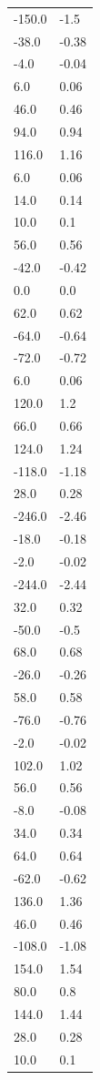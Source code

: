 \begin{longtable}{ll}
-150.0 & -1.5 \\
-38.0 & -0.38 \\
-4.0 & -0.04 \\
6.0 & 0.06 \\
46.0 & 0.46 \\
94.0 & 0.94 \\
116.0 & 1.16 \\
6.0 & 0.06 \\
14.0 & 0.14 \\
10.0 & 0.1 \\
56.0 & 0.56 \\
-42.0 & -0.42 \\
0.0 & 0.0 \\
62.0 & 0.62 \\
-64.0 & -0.64 \\
-72.0 & -0.72 \\
6.0 & 0.06 \\
120.0 & 1.2 \\
66.0 & 0.66 \\
124.0 & 1.24 \\
-118.0 & -1.18 \\
28.0 & 0.28 \\
-246.0 & -2.46 \\
-18.0 & -0.18 \\
-2.0 & -0.02 \\
-244.0 & -2.44 \\
32.0 & 0.32 \\
-50.0 & -0.5 \\
68.0 & 0.68 \\
-26.0 & -0.26 \\
58.0 & 0.58 \\
-76.0 & -0.76 \\
-2.0 & -0.02 \\
102.0 & 1.02 \\
56.0 & 0.56 \\
-8.0 & -0.08 \\
34.0 & 0.34 \\
64.0 & 0.64 \\
-62.0 & -0.62 \\
136.0 & 1.36 \\
46.0 & 0.46 \\
-108.0 & -1.08 \\
154.0 & 1.54 \\
80.0 & 0.8 \\
144.0 & 1.44 \\
28.0 & 0.28 \\
10.0 & 0.1 \\

\end{longtable}
